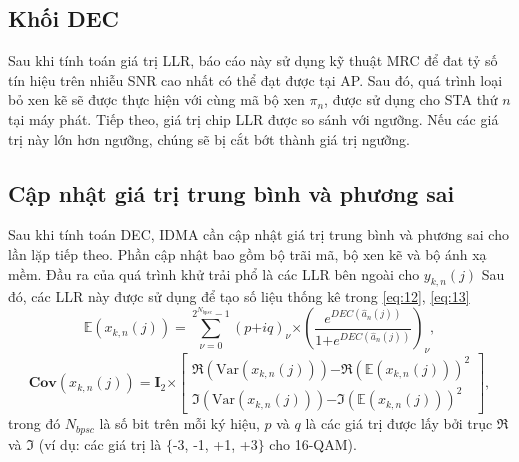\subsection{Khối DEC}

Sau khi tính toán giá trị LLR, báo cáo này sử dụng kỹ thuật \acrshort{MRC} để đat tỷ số tín hiệu trên nhiễu \acrshort{SNR} cao nhất có thể đạt được tại AP. Sau đó, quá trình loại bỏ xen kẽ sẽ được thực hiện với cùng mã bộ xen $\pi_n$, được sử dụng cho STA thứ $n$ tại máy phát. Tiếp theo, giá trị chip LLR được so sánh với ngưỡng. Nếu các giá trị này lớn hơn ngưỡng, chúng sẽ bị cắt bớt thành giá trị ngưỡng.

\subsection{Cập nhật giá trị trung bình và phương sai} \label{update}
Sau khi tính toán DEC, IDMA cần cập nhật giá trị trung bình và phương sai cho lần lặp tiếp theo. Phần cập nhật bao gồm bộ trãi mã, bộ xen kẽ và bộ ánh xạ mềm. Đầu ra của quá trình khử trải phổ là các LLR bên ngoài cho $y_{k,n}(j)$ Sau đó, các LLR này được sử dụng để tạo số liệu thống kê trong \eqref{eq:12}, \eqref{eq:13}
\begin{equation}
	\mathbb{E}(x_{k,n}(j)) = \sum_{\nu = 0}^{2^{N_{bpsc}}-1} (p \mathord{+}iq)_\nu \mathord{\times} \left(\dfrac{e^{DEC(\hat{a}_n(j))}}{1 \mathord{+} e^{DEC(\hat{a}_n(j))}}\right)_\nu,
	\label{eq:12}
\end{equation}
\begin{equation}
	\textbf{Cov}(x_{k,n}(j))
	=\textbf{I}_2 \mathord{\times}
	\begin{bmatrix}
		\Re(\text{Var}(x_{k,n}(j))) \mathord{-} \Re(\mathbb{E}(x_{k,n}(j)))^2 \\
		\Im(\text{Var}(x_{k,n}(j))) \mathord{-} \Im(\mathbb{E}(x_{k,n}(j)))^2
	\end{bmatrix},
	\label{eq:13}
\end{equation}
trong đó $N_{bpsc}$ là số bit trên mỗi ký hiệu, $p$ và $q$ là các giá trị được lấy bởi trục $\Re$ và $\Im$ (ví dụ: các giá trị là $\{$-3, -1, +1, +3$\}$ cho 16-QAM).
